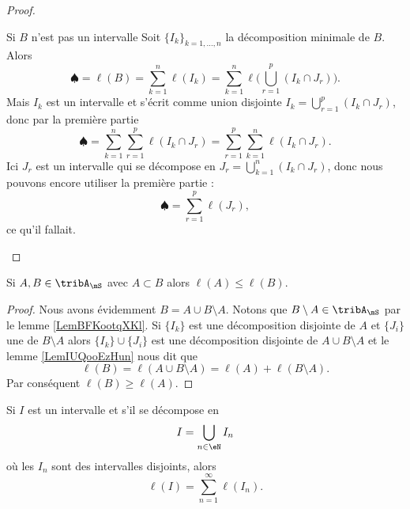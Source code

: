 \begin{proof}
\begin{subproof}
    \item[Si \( B\) n'est pas un intervalle]
        Soit \( \{ I_k \}_{k=1,\ldots, n}\) la décomposition minimale de \( B\). Alors
        \begin{equation}
            \spadesuit=\ell(B)=\sum_{k=1}^n\ell(I_k)=\sum_{k=1}^n\ell\big( \bigcup_{r=1}^p(I_k\cap J_r) \big).
        \end{equation}
        Mais \( I_k\) est un intervalle et s'écrit comme union disjointe \( I_k=\bigcup_{r=1}^p(I_k\cap J_r)\), donc par la première partie
        \begin{equation}
            \spadesuit=\sum_{k=1}^n\sum_{r=1}^p\ell(I_k\cap J_r)=\sum_{r=1}^p\sum_{k=1}^n\ell(I_k\cap J_r).
        \end{equation}
        Ici \( J_r\) est un intervalle qui se décompose en \( J_r=\bigcup_{k=1}^n(I_k\cap J_r)\), donc nous pouvons encore utiliser la première partie :
        \begin{equation}
            \spadesuit=\sum_{r=1}^p\ell(J_r),
        \end{equation}
        ce qu'il fallait.
    \end{subproof}
\end{proof}

\begin{lemma}   \label{LemPIOooRLkbo}
    Si \( A,B\in\tribA_{\mS}\) avec \( A\subset B\) alors \( \ell(A)\leq \ell(B)\).
\end{lemma}

\begin{proof}
    Nous avons évidemment \( B=A\cup B\setminus A\). Notons que \( B\setminus A\in\tribA_{\mS}\) par le lemme \ref{LemBFKootqXKl}. Si \( \{ I_k \}\) est une décomposition disjointe de \( A\) et \( \{ J_i \}\) une de \( B\setminus A\) alors \( \{ I_k \}\cup\{ J_i \}\) est une décomposition disjointe de \( A\cup B\setminus A\) et le lemme \ref{LemIUQooEzHun} nous dit que
    \begin{equation}
        \ell(B)=\ell(A\cup B\setminus A)=\ell(A)+\ell(B\setminus A).
    \end{equation}
    Par conséquent \( \ell(B)\geq \ell(A)\).
\end{proof}

\begin{lemma}   \label{LemUMVooZJgMu}
    Si \( I\) est un intervalle et s'il se décompose en
    \begin{equation}
        I=\bigcup_{n\in \eN}I_n
    \end{equation}
    où les \( I_n\) sont des intervalles disjoints, alors
    \begin{equation}
        \ell(I)=\sum_{n=1}^{\infty}\ell(I_n).
    \end{equation}
\end{lemma}

